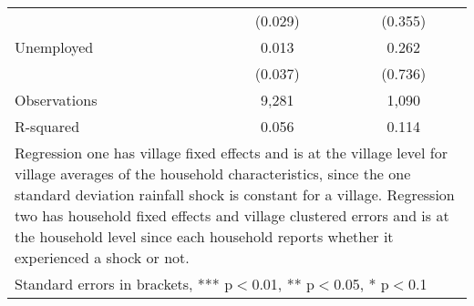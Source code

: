 \begin{table}
\begin{tabular}{lcc}
 & (0.029)  & (0.355) \\
Unemployed & 0.013 & 0.262\\
 & (0.037) & (0.736)  \\
Observations & 9,281 & 1,090 \\
R-squared & 0.056 & 0.114 \\ \hline
\multicolumn{3}{p{12cm}}{Regression one has village fixed effects and is at the village level for village averages of the household characteristics, since the one standard deviation rainfall shock is constant for a village. Regression two has household fixed effects and village clustered errors and is at the household level since each household reports whether it experienced a shock or not.  } \\
\multicolumn{3}{l}{ Standard errors in brackets, *** p$<$0.01, ** p$<$0.05, * p$<$0.1} \\
\end{tabular}
\end{table}